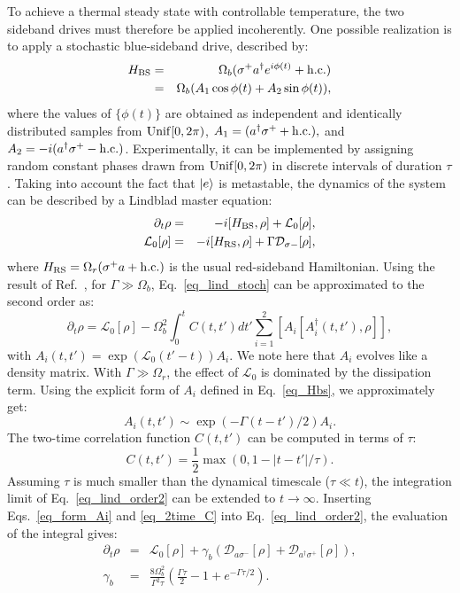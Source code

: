 \documentclass[%
reprint,
superscriptaddress,
amsmath,amssymb,
aps,
prl,
floatfix,
]{revtex4-2}
\begin{document}
To achieve a thermal steady state with controllable temperature, the two sideband drives must therefore be applied incoherently. One possible realization is to apply a stochastic blue-sideband drive, described by:
\begin{eqnarray}
    H_{\rm BS}&=&  \Omega_b(\sigma^+a^\dagger e^{i\phi(t)}+\rm h.c.)\nonumber\\
    &=& \Omega_b(A_1\cos\phi(t)+A_2\sin\phi (t)),
    \label{eq_Hbs}
\end{eqnarray}
where  the values of $\{\phi(t)\}$ are obtained as independent and identically distributed samples from  ${\rm Unif}[0,2\pi)$, $A_1= (a^\dagger \sigma^+ + {\rm h.c.}),$ and $A_2=-i(a^\dagger \sigma^+-\rm h.c.)$. Experimentally, it can be implemented by assigning random constant phases drawn from ${\rm Unif}[0,2\pi)$ in discrete intervals of duration $\tau$. Taking into account the fact that $\ket{e}$ is metastable, the dynamics of the system can be described by a Lindblad master equation:
\begin{eqnarray}
        \partial_t\rho&=&-i[H_{\rm BS},\rho]+ \mathcal{L}_0[\rho],\nonumber\\
        \mathcal{L}_0[\rho]&=&-i[H_{\rm RS},\rho]+\Gamma\mathcal{D}_{\sigma-}[\rho],
        \label{eq_lind_stoch}
\end{eqnarray}
where $H_{\rm RS}=\Omega_{r}(\sigma^+a+{\rm h.c.})$
is the usual red-sideband Hamiltonian.
Using the result of Ref.~\cite{chenu2017noise}, for $\Gamma\gg\Omega_b$, Eq.~\eqref{eq_lind_stoch} can be approximated to the second order as:
\begin{equation}
    \partial_t \rho = \mathcal{L}_0[\rho] - \Omega_b^2\int_0^tC(t,t') dt' \sum_{i=1}^2{\left[A_i\left[A_i^\dagger(t,t'),\rho\right]\right]},
    \label{eq_lind_order2}
\end{equation}
with $A_i(t,t')=\exp(\mathcal{L}_0(t'-t))A_i$. We note here that $A_i$ evolves like a density matrix. With $\Gamma\gg\Omega_r$, the effect of $\mathcal{L}_0$ is dominated by the dissipation term. Using the explicit form of $A_i$ defined in Eq.~\eqref{eq_Hbs}, we approximately get: 
\begin{equation}
    A_i(t,t')\sim \exp(-\Gamma(t-t')/2)A_i.
    \label{eq_form_Ai}
\end{equation}
The two-time correlation function  $C(t,t')$ can be computed in terms of $\tau$:
\begin{equation}
    C(t,t')=\frac{1}{2}\max(0,1-|t-t'|/\tau).
    \label{eq_2time_C}
\end{equation}
Assuming $\tau$ is much smaller than the dynamical timescale ($\tau\ll t$), the integration limit of Eq.~\eqref{eq_lind_order2} can be extended to $t\rightarrow\infty$. Inserting Eqs.~\eqref{eq_form_Ai} and \eqref{eq_2time_C} into Eq.~\eqref{eq_lind_order2}, the evaluation of the integral gives:
\begin{eqnarray}
     \partial_t\rho&=& \mathcal{L}_0[\rho]+\gamma_b\left(\mathcal{D}_{a\sigma^-}\left[\rho\right]+\mathcal{D}_{a^\dagger\sigma^+}\left[\rho\right]\right),\nonumber\\
     \gamma_b&=& \frac{8\Omega_b^2}{\Gamma^2\tau}\left(\frac{\Gamma\tau}{2}-1+e^{-\Gamma\tau/2}\right).
        \label{eq_lind_hc_full}
\end{eqnarray}
\end{document}
